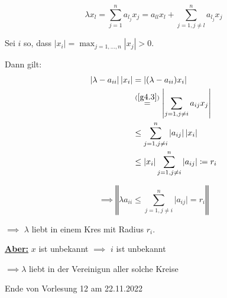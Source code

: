 \documentclass{book}
\begin{document}
            \begin{equation}\label{g4.3}
                \lambda x_l = \sum_{j=1}^n a_{l_j}x_j=a_{ll}x_l+\sum_{j=1,j \neq l}^n a_{l_j}x_j
            \end{equation}


            Sei $i$ so, dass $\vert x_i\vert =\max_{j=1,\dots, n}|x_j|>0$.

            Dann gilt: 
            \begin{align*}
                \left\vert \lambda -a_{ii} \right\vert \left\vert x_i \right\vert &= \left\vert (\lambda-a_{ii})x_i \right\vert\\
                &\stackrel{(\ref{g4.3})}{=}\left\vert \sum_{j=1,j\neq i} a_{ij}x_j \right\vert\\
                &\leq \sum_{j=1,j\neq i}^n \left\vert a_{ij} \right\vert \left\vert x_i \right\vert \\ 
                &\leq \vert x_i \vert \sum_{j=1,j\neq i}^n \left\vert a_{ij} \right\vert \coloneqq r_i
            \end{align*}

            \[\implies \left\Vert \lambda a_{ii} \leq \sum_{j=1,j\neq i}^n \vert a_{ij}\vert = r_i\right\Vert\]

            $\implies$ $\lambda$ liebt in einem Kres mit Radius $r_i$.

            \underline{\textbf{Aber:}} $x$ ist unbekannt $\implies$ $i$ ist unbekannt 

            $\implies \lambda$ liebt in der Vereinigun aller solche Kreise

            \noindent
            \xrfill[0.7ex]{1pt}Ende von Vorlesung 12 am 22.11.2022\xrfill[0.7ex]{1pt}
            
\end{document}

